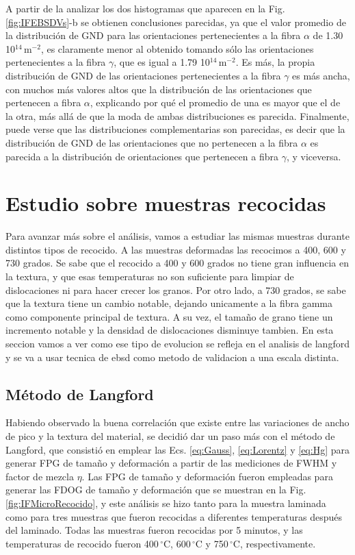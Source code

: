 A partir de la analizar los dos histogramas que aparecen en la Fig. \ref{fig:IFEBSDVs}-b se obtienen conclusiones parecidas, ya que el valor promedio de la distribución de GND para las orientaciones pertenecientes a la fibra $\alpha$ de 1.30 10$^{14}$\,m$^{-2}$, es claramente menor al obtenido tomando sólo las orientaciones pertenecientes a la fibra $\gamma$, que es igual a 1.79 10$^{14}$\,m$^{-2}$.
Es más, la propia distribución de GND de las orientaciones pertenecientes a la fibra $\gamma$ es más ancha, con muchos más valores altos que la distribución de las orientaciones que pertenecen a fibra $\alpha$, explicando por qué el promedio de una es mayor que el de la otra, más allá de que la moda de ambas distribuciones es parecida.
Finalmente, puede verse que las distribuciones complementarias son parecidas, es decir que la distribución de GND de las orientaciones que no pertenecen a la fibra $\alpha$ es parecida a la distribución de orientaciones que pertenecen a fibra $\gamma$, y viceversa.

\section{Estudio sobre muestras recocidas}\label{S:IFRec}
Para avanzar más sobre el análisis, vamos a estudiar las mismas muestras durante distintos tipos de recocido. A las muestras deformadas las recocimos a 400, 600 y 730 grados. Se sabe que el recocido a 400 y 600 grados no tiene gran influencia en la textura, y que esas temperaturas no son suficiente para limpiar de dislocaciones ni para hacer crecer los granos. Por otro lado, a 730 grados, se sabe que la textura tiene un cambio notable, dejando unicamente a la fibra gamma como componente principal de textura. A su vez, el tamaño de grano tiene un incremento notable y la densidad de dislocaciones disminuye tambien.
En esta seccion vamos a ver como ese tipo de evolucion se refleja en el analisis de langford y se va a usar tecnica de ebsd como metodo de validacion a una escala distinta.

\subsection{Método de Langford}\label{SS:IFRecLang}
Habiendo observado la buena correlación que existe entre las variaciones de ancho de pico y la textura del material, se decidió dar un paso más con el método de Langford, que consistió en emplear las Ecs. \ref{eq:Gauss}, \ref{eq:Lorentz} y \ref{eq:Hg} para generar FPG de tamaño y deformación a partir de las mediciones de FWHM y factor de mezcla $\eta$.
Las FPG de tamaño y deformación fueron empleadas para generar las FDOG de tamaño y deformación que se muestran en la Fig. \ref{fig:IFMicroRecocido}, y este análisis se hizo tanto para la muestra laminada como para tres muestras que fueron recocidas a diferentes temperaturas después del laminado.
Todas las muestras fueron recocidas por 5 minutos, y las temperaturas de recocido fueron 400\,$^{\circ}$C, 600\,$^{\circ}$C y 750\,$^{\circ}$C, respectivamente.

